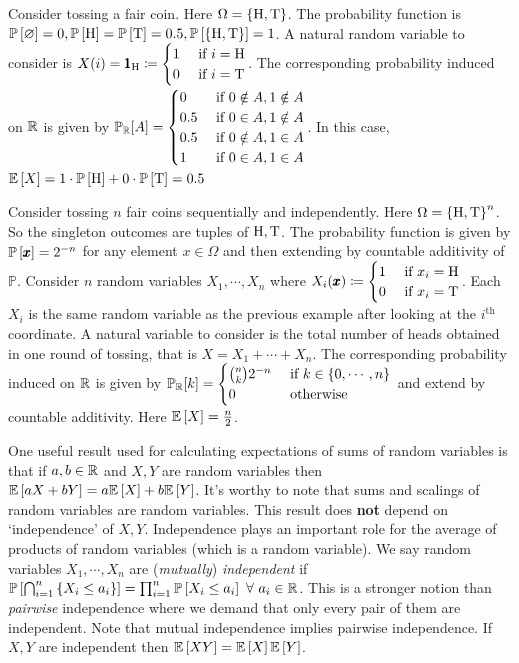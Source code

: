 \begin{ex}
Consider tossing a fair coin. Here $\Omega=\set{\text H, \text T}$. The probability function is $\P{\varnothing}=0, \P{\text H}=\P{\text T}=0.5, \P{\set{\text H,\text T}}=1$. A natural random variable to consider is $X(i) = \pmb 1_{\text H} \sett \begin{cases}1&\text{ if } i=\text H\\0&\text{ if } i=\text T\end{cases}$. The corresponding probability induced on $\R$ is given by $\mathbb P_{\R}[A] = \begin{cases}
0 &\text{ if } 0\notin A,1\notin A\\
0.5 &\text{ if } 0\in A,1\notin A\\
0.5 &\text{ if } 0\notin A,1\in A\\
1 &\text{ if } 0\in A,1\in A\\
\end{cases}$. In this case, $\E X = 1\cdot \P{\text H} + 0\cdot \P{\text T} = 0.5$
\end{ex}

\begin{ex}
Consider tossing $n$ fair coins sequentially and independently. Here $\Omega=\set{\text H, \text T}^{n}$. So the singleton outcomes are tuples of $\text H,\text T$. The probability function is given by $\P{\pmb x}=2^{-n}$ for any element $x\in {\Omega}$ and then extending by countable additivity of $\mathbb P$. Consider $n$ random variables $X_{1},\cdots,X_{n}$ where $X_{i}(\pmb x) \sett \begin{cases}1&\text{ if } x_{i}= \text H\\0&\text{ if } x_{i}=\text T\end{cases}$. Each $X_{i}$ is the same random variable as the previous example after looking at the $i^{\text{th}}$ coordinate. A natural variable to consider is the total number of heads obtained in one round of tossing, that is $X = X_{1}+\cdots+X_{n}$. The corresponding probability induced on $\R$ is given by $\mathbb P_{\R}[k] = \begin{cases}
{n\choose k}2^{-n} &\text{ if } k\in \set{0,\cdots,n}\\
0 &\text{ otherwise}
\end{cases}$ and extend by countable additivity. Here $\E X = \frac{n}{2}$.
\end{ex}

One useful result used for calculating expectations of sums of random variables is that if $a,b\in \R$ and $X,Y$ are random variables then $\E{aX+bY}=a\E{X}+b\E{Y}$. It's worthy to note that sums and scalings of random variables are random variables. This result does \textbf{not} depend on `independence' of $X,Y$. Independence plays an important role for the average of products of random variables (which is a random variable). We say random variables $X_{1},\cdots,X_{n}$ are (\textit{mutually}) \textit{independent} if $\P{\bigcap_{i=1}^{n}\set{X_{i}\le a_{i}}} = \prod_{i=1}^{n}\P{X_{i}\le a_{i}}\fa a_{i}\in\R$. This is a stronger notion than \textit{pairwise} independence where we demand that only every pair of them are independent. Note that mutual independence implies pairwise independence. If $X,Y$ are independent then $\E{XY} = \E{X}\E{Y}$. 

